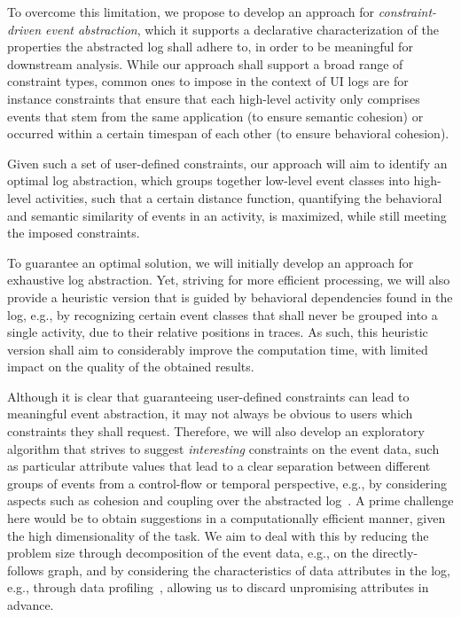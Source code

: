 To overcome this limitation, we propose to develop an approach for \emph{constraint-driven event abstraction}, which it supports a declarative characterization of the properties the abstracted log shall adhere to, in order to be meaningful for downstream analysis. While our approach shall support a broad range of constraint types, common ones to impose in the context of UI logs are for instance constraints that ensure that each high-level activity only comprises events that stem from the same application (to ensure semantic cohesion) or occurred within a certain timespan of each other (to ensure behavioral cohesion). 

Given such a set of user-defined constraints, our approach will aim to identify an optimal log abstraction, which groups together low-level event classes into high-level activities, such that a certain distance function, quantifying the behavioral and semantic similarity of events in an activity, is maximized, while still meeting the imposed constraints.

To guarantee an optimal solution, we will initially develop an approach for exhaustive log abstraction. Yet, striving for more efficient processing, we will also provide a heuristic version that is guided by behavioral dependencies found in the log, e.g., by recognizing certain event classes that shall never be grouped into a single activity, due to their relative positions in traces.
As such, this heuristic version shall aim to considerably improve the computation time, with limited impact on the quality of the obtained results.

Although it is clear that guaranteeing user-defined constraints can lead to meaningful event abstraction, it may not always be obvious to users which constraints they shall request. Therefore, we will also develop an exploratory algorithm that strives to suggest \emph{interesting} constraints on the event data, such as particular attribute values that lead to a clear separation between different groups of events from a control-flow or temporal perspective, e.g., by considering aspects such as cohesion and coupling over the  abstracted log~\cite{vanderfeesten2007quality}. 
A prime challenge here would be to obtain suggestions in a computationally efficient manner, given the high dimensionality of the task. We aim to deal with this by reducing the problem size through decomposition of the event data, e.g., on the directly-follows graph, and by considering the characteristics of data attributes in the log, e.g., through data profiling~\cite{papenbrock2015data}, allowing us to discard unpromising attributes in advance.


